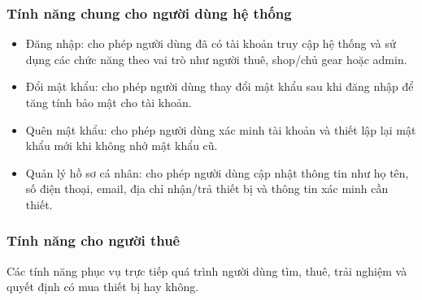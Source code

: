 \subsubsection{Tính năng chung cho người dùng hệ thống}

\begin{itemize}
    \item Đăng nhập: cho phép người dùng đã có tài khoản truy cập hệ thống và sử dụng các chức năng theo vai trò như người thuê, shop/chủ gear hoặc admin.
    \item Đổi mật khẩu: cho phép người dùng thay đổi mật khẩu sau khi đăng nhập để tăng tính bảo mật cho tài khoản.
    \item Quên mật khẩu: cho phép người dùng xác minh tài khoản và thiết lập lại mật khẩu mới khi không nhớ mật khẩu cũ.
    \item Quản lý hồ sơ cá nhân: cho phép người dùng cập nhật thông tin như họ tên, số điện thoại, email, địa chỉ nhận/trả thiết bị và thông tin xác minh cần thiết.
\end{itemize}

\subsubsection{Tính năng cho người thuê}

Các tính năng phục vụ trực tiếp quá trình người dùng tìm, thuê, trải nghiệm và quyết định có mua thiết bị hay không.

